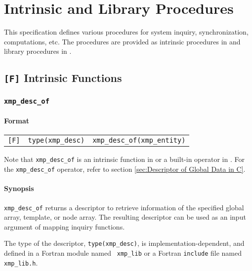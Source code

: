 \chapter{Intrinsic and Library Procedures}
\label{chap:Intrinsic and library procedures}

This specification defines various procedures for system inquiry,
synchronization, computations, etc. The procedures are provided as
intrinsic procedures in {\XMPF} and library procedures in {\XMPC}.

\section{{\tt [F]} Intrinsic Functions}

\subsection{{\tt xmp\_desc\_of}}
\label{subsec: xmp_desc_of}

\subsubsection*{Format}

\begin{tabular}{lll}

\verb![F]!&  {\tt type(xmp\_desc)}& {\tt xmp\_desc\_of(xmp\_entity)}\\

\end{tabular}

\vspace{0.3cm}

Note that {\tt xmp\_desc\_of} is an intrinsic function in {\XMPF} or
a built-in operator in {\XMPC}. For the {\tt xmp\_desc\_of} operator,
refer to section \ref{sec:Descriptor of Global Data in C}.

\subsubsection*{Synopsis}

{\tt xmp\_desc\_of} returns a descriptor to retrieve information of the
specified global array, template, or node array. The resulting
descriptor can be used as an input argument of mapping inquiry functions.

The type of the descriptor, {\tt type(xmp\_desc)}, is
implementation-dependent, and defined in a Fortran module named {\tt
xmp\_lib} or a Fortran {\tt include} file named {\tt xmp\_lib.h}.

